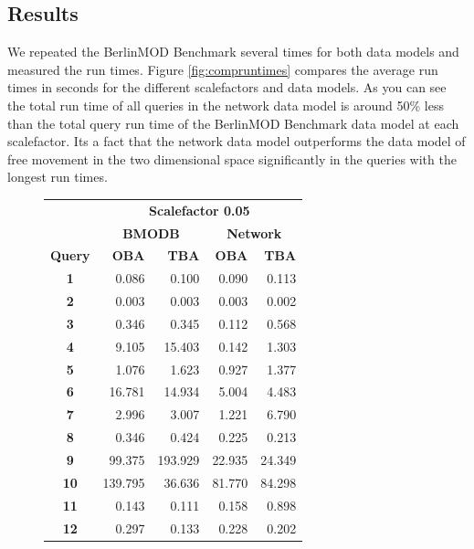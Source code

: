 \documentclass[a4paper]{article}
\newcommand{\bmodb} {BerlinMOD Benchmark}
\begin{document}
\subsection{Results}
\label{sec:results}
We repeated the \bmodb{} several times for both data models and measured the
run times. Figure \ref{fig:compruntimes} compares the average run times in seconds
for the different scalefactors and data models. As you can see the total run time
of all queries in the network data model is around 50\% less than the total query
run time of the \bmodb{} data model at each scalefactor. Its a fact that the
network data model outperforms the data model of free movement in the two
dimensional space significantly in the queries with the longest run times.
\begin{figure}[h]
  \begin{minipage}{0.5\linewidth}
    \begin{tiny}
      \begin{tabular}{|c|r|r|r|r|}
        \hline
        &\multicolumn{4}{c|}{\textbf{Scalefactor 0.05}}\\
        \cline{2-5}
        &\multicolumn{2}{c|}{\textbf{BMODB}}&\multicolumn{2}{c|}{\textbf{Network}}\\
        \hline
        \textbf{Query}&\textbf{OBA}&\textbf{TBA}&\textbf{OBA}&\textbf{TBA}\\
        \hline
        \textbf{1}&0.086&0.100&0.090&0.113\\
        \hline
        \textbf{2}&0.003&0.003&0.003&0.002\\
        \hline
        \textbf{3}&0.346&0.345&0.112&0.568\\
        \hline
        \textbf{4}&9.105&15.403&0.142&1.303\\
        \hline
        \textbf{5}&1.076&1.623&0.927&1.377\\
        \hline
        \textbf{6}&16.781&14.934&5.004&4.483\\
        \hline
        \textbf{7}&2.996&3.007&1.221&6.790\\
        \hline
        \textbf{8}&0.346&0.424&0.225&0.213\\
        \hline
        \textbf{9}&99.375&193.929&22.935&24.349\\
        \hline
        \textbf{10}&139.795&36.636&81.770&84.298\\
        \hline
        \textbf{11}&0.143&0.111&0.158&0.898\\
        \hline
        \textbf{12}&0.297&0.133&0.228&0.202\\

\end{tabular}
\end{tiny}
\end{minipage}
\end{figure}
\end{document}
